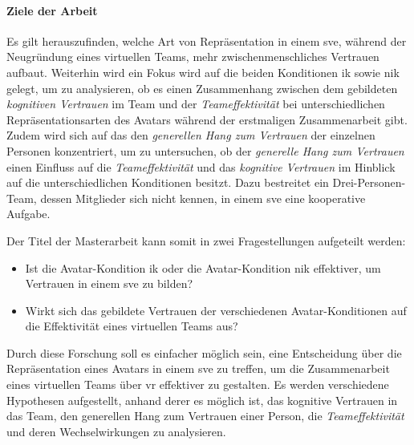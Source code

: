 \documentclass[a4paper,11pt]{article}%
\renewcommand{\\}{\vspace*{0.5\baselineskip} \newline}
\begin{document}
	\paragraph{Ziele der Arbeit}
%


Es gilt herauszufinden, welche Art von Repräsentation in einem \ac{sve}, während der Neugründung eines virtuellen Teams, mehr zwischenmenschliches Vertrauen aufbaut. Weiterhin wird ein Fokus wird auf die beiden Konditionen \ac{ik} sowie \ac{nik} gelegt, um zu analysieren, ob es einen Zusammenhang zwischen dem gebildeten \textit{kognitiven Vertrauen} im Team und der \textit{Teameffektivität} bei unterschiedlichen Repräsentationsarten des Avatars während der erstmaligen Zusammenarbeit gibt.
Zudem wird sich auf das den \textit{generellen Hang zum Vertrauen} der einzelnen Personen konzentriert, um zu untersuchen, ob der \textit{generelle Hang zum Vertrauen} einen Einfluss auf die \textit{Teameffektivität} und das \textit{kognitive Vertrauen} im Hinblick auf die unterschiedlichen Konditionen besitzt. Dazu bestreitet ein Drei-Personen-Team, dessen Mitglieder sich nicht kennen, in einem \ac{sve} eine kooperative Aufgabe.

Der Titel der Masterarbeit kann somit in zwei Fragestellungen aufgeteilt werden:
\begin{itemize}
\item Ist die Avatar-Kondition \ac{ik} oder die Avatar-Kondition \ac{nik} effektiver, um Vertrauen in einem \ac{sve} zu bilden?
\item Wirkt sich das gebildete Vertrauen der verschiedenen Avatar-Konditionen auf die Effektivität eines virtuellen Teams aus?
\end{itemize}

Durch diese Forschung soll es einfacher möglich sein, eine Entscheidung über die Repräsentation eines Avatars in einem \ac{sve} zu treffen, um die Zusammenarbeit eines virtuellen Teams über \ac{vr} effektiver zu gestalten.
Es werden verschiedene Hypothesen aufgestellt, anhand derer es möglich ist, das kognitive Vertrauen in das Team, den generellen Hang zum Vertrauen einer Person, die \textit{Teameffektivität} und deren Wechselwirkungen zu analysieren.
\end{document}
